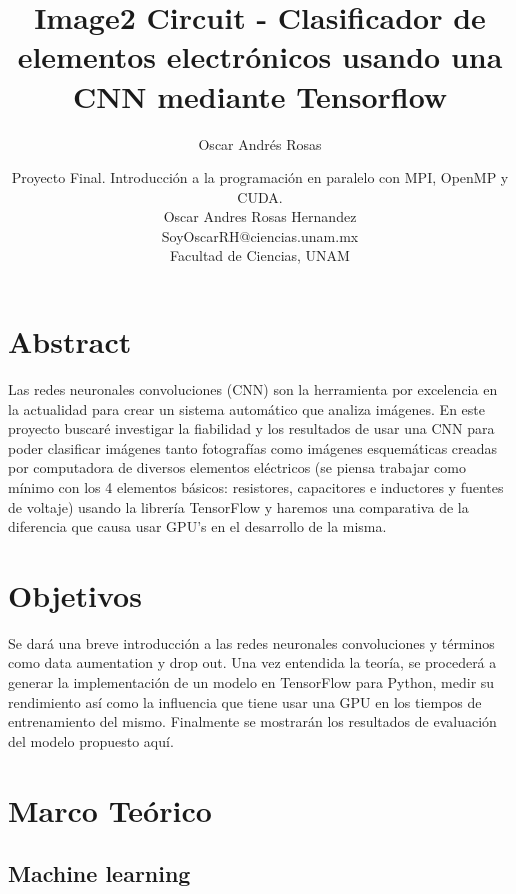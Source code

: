 \documentclass[10pt, fleqn, journal]{IEEEtran}
\author{Oscar Andrés Rosas}                                     %
\theoremstyle{break}                                            %
\begin{document}
  \title{
    \textbf{Image2 Circuit}
     - Clasificador de elementos electrónicos usando una CNN mediante Tensorflow
  }

  \author{
    Proyecto Final. Introducción a la programación en paralelo con MPI, OpenMP y CUDA. \\[0.2in]
    Oscar Andres Rosas Hernandez \\
    SoyOscarRH@ciencias.unam.mx \\
    Facultad de Ciencias, UNAM
  }


  \maketitle

  \section*{Abstract}

  Las redes neuronales convoluciones (CNN) son la herramienta por excelencia en la actualidad para crear un
  sistema automático que analiza imágenes.
  En este proyecto buscaré investigar la fiabilidad y los resultados de usar una CNN para poder clasificar imágenes
  tanto fotografías como imágenes esquemáticas creadas por computadora de diversos elementos eléctricos
  (se piensa trabajar como mínimo con los 4 elementos básicos: resistores, capacitores e inductores y fuentes de voltaje)
  usando la librería TensorFlow y haremos una comparativa de
  la diferencia que causa usar GPU's en el desarrollo de la misma.
  
  \section{Objetivos}
  
    Se dará una breve introducción a las redes neuronales convoluciones y términos como data aumentation y drop out.
    Una vez entendida la teoría, se procederá a generar la implementación de un modelo en TensorFlow para Python, medir
    su rendimiento así como la influencia que tiene usar una GPU en los tiempos de entrenamiento del mismo.
    Finalmente se mostrarán los resultados de evaluación del modelo propuesto aquí.
    
  \section{Marco Teórico}
    
    \subsection{Machine learning}
    
\end{document}
